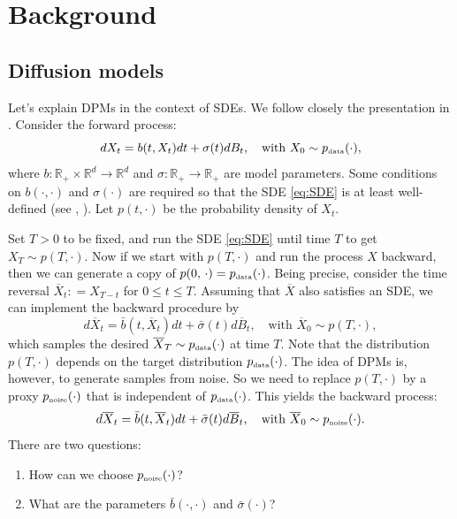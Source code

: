 \documentclass[letterpaper,11pt,reqno]{amsart}
\numberwithin{equation}{section}
\begin{document}
\section{Background}
\label{sc2}

\subsection{Diffusion models}
\label{sc21}

Let's explain DPMs in the context of SDEs. 
We follow closely the presentation in \cite{Tutorial}.
Consider the forward process: 
\begin{equation}
\label{eq:SDE}
dX_t = b(t, X_t) dt + \sigma(t) dB_t, \quad \mbox{with } X_0 \sim p_{\tiny \mbox{data}}(\cdot),
\end{equation}
where
$b: \mathbb{R}_+ \times \mathbb{R}^d \to \mathbb{R}^d$ and 
 $\sigma: \mathbb{R}_+  \to \mathbb{R}_+$
are model parameters.
Some conditions on $b(\cdot, \cdot)$ and $\sigma(\cdot)$ are required
so that the SDE \eqref{eq:SDE} is at least well-defined (see \cite[Chapter 5]{KS91}, \cite[Section 3.1]{TZ23}).
Let $p(t, \cdot)$ be the probability density of $X_t$.

\quad Set $T > 0$ to be fixed, and run the SDE \eqref{eq:SDE} until time $T$ to get $X_T \sim p(T, \cdot)$.
Now if we start with $p(T, \cdot)$ and run the process $X$ backward,
then we can generate a copy of $p(0, \, \cdot) = p_{\tiny \mbox{data}}(\cdot)$.
Being precise, consider the time reversal $\overline{X}_t: = X_{T-t}$ for $0 \le t \le T$.
Assuming that $\overline{X}$ also satisfies an SDE, 
we can implement the backward procedure by
\begin{equation*}
d\overline{X}_t = \bar{b}(t, \overline{X}_t) dt + \bar{\sigma}(t) d\overline{B}_t, \quad \mbox{with } \overline{X}_0 \sim p(T, \cdot),
\end{equation*}
which samples the desired $\overline{X}_T  \sim p_{\tiny \mbox{data}}(\cdot)$ at time $T$.
Note that the distribution $p(T, \cdot)$ depends on the target distribution $p_{\tiny \mbox{data}}(\cdot)$.
The idea of DPMs is, however, to generate samples from noise.
So we need to replace $p(T, \cdot)$ by a proxy $p_{\tiny \mbox{noise}}(\cdot)$ that is independent of $p_{\tiny \mbox{data}}(\cdot)$.
This yields the backward process:
\begin{equation}
\label{eq:SDErev}
d\overline{X}_t = \bar{b}(t, \overline{X}_t) dt + \bar{\sigma}(t) d \overline{B}_t, \quad \mbox{with } \overline{X}_0 \sim p_{\tiny \mbox{noise}}(\cdot).
\end{equation}
There are two questions:
\begin{enumerate}[itemsep = 3 pt]
\item
How can we choose $p_{\tiny \mbox{noise}}(\cdot)$?
\item
What are the parameters $\bar{b}(\cdot, \cdot)$ and $\bar{\sigma}(\cdot)$?
\end{enumerate}
\end{document}
